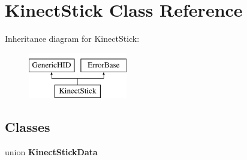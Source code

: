 \hypertarget{classKinectStick}{
\section{KinectStick Class Reference}
\label{classKinectStick}
}
Inheritance diagram for KinectStick:\begin{figure}[H]
\begin{center}
\leavevmode
\includegraphics[height=2.000000cm]{classKinectStick}
\end{center}
\end{figure}
\subsection*{Classes}
\begin{DoxyCompactItemize}
\item 
union {\bfseries KinectStickData}
\end{DoxyCompactItemize}
